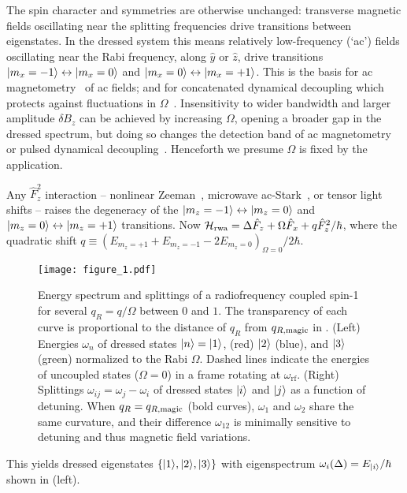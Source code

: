 \documentclass[aps,prl,reprint,superscriptaddress,floatfix]{revtex4-1}
\begin{document}
The spin character and symmetries are otherwise unchanged: transverse magnetic fields oscillating near the splitting frequencies drive transitions between eigenstates.
In the dressed system this means relatively low-frequency (`ac') fields oscillating near the Rabi frequency, along $\hat{y}$ or $\hat{z}$, drive transitions $\vert m_x=-1 \rangle  \leftrightarrow \vert m_x=0 \rangle $ and $\vert m_x=0 \rangle  \leftrightarrow \vert m_x=+1 \rangle $.
This is the basis for ac magnetometry~\cite{hirose_continuous_2012} of ac fields; and for concatenated dynamical decoupling  which protects against fluctuations in $\Omega$~\cite{cai_robust_2012}.
Insensitivity to wider bandwidth and larger amplitude $\delta B_z$ can be achieved by increasing $\Omega$, opening a broader gap in the dressed spectrum, but doing so changes the detection band of ac magnetometry~\cite{loretz_radio-frequency_2013} or pulsed dynamical decoupling~\cite{boss_quantum_2017,*schmitt_submillihertz_2017}.
Henceforth we presume $\Omega$ is fixed by the application.

Any $\hat{F}_z^2$ interaction -- nonlinear Zeeman~\cite{ramsey_molecular_1956}, microwave ac-Stark~\cite{gerbier_resonant_2006}, or tensor light~\cite{smith_continuous_2004} shifts -- raises the degeneracy of the $\vert m_z=-1 \rangle  \leftrightarrow \vert m_z=0 \rangle $ and $\vert m_z=0 \rangle  \leftrightarrow \vert m_z=+1 \rangle $ transitions. 
Now $\mathcal{H}_{\text{rwa}} = \Delta \hat{F}_z + \Omega \hat{F}_x + q \hat{F}_z^2/\hbar$, where the quadratic shift $q \equiv (E_{m_z=+1} + E_{m_z=-1} - 2 E_{m_z=0})_{\Omega=0}/2\hbar$.
\begin{figure}
    \texttt{[image: figure\_1.pdf]}
    \caption{
    \label{fig:eigensystem_schematic}
        Energy spectrum and splittings of a radiofrequency coupled spin-1 for several $q_R = q/\Omega$ between $0$ and $1$.
        The transparency of each curve is proportional to the distance of $q_R$ from $q_{R,\text{magic}}$ in .
        (Left) Energies $\omega_n$ of dressed states $\vert n \rangle =\vert 1 \rangle $, (red) $\vert 2 \rangle $ (blue), and $\vert 3 \rangle $ (green) normalized to the Rabi $\Omega$.
        Dashed lines indicate the energies of uncoupled states ($\Omega=0$) in a frame rotating at $\omega_{\text{rf}}$.
        (Right) Splittings $\omega_{ij} = \omega_j - \omega_i$ of dressed states $\vert i \rangle $ and $\vert j \rangle $ as a function of detuning.
        When $q_R=q_{R,\text{magic}}$ (bold curves), $\omega_1$ and $\omega_2$ share the same curvature, and their difference $\omega_{12}$ is minimally sensitive to detuning and thus magnetic field variations.
    }
\end{figure}
This yields dressed eigenstates $\{\vert 1 \rangle , \vert 2 \rangle , \vert 3 \rangle \}$ with eigenspectrum $\omega_i(\Delta) = E_{\vert i \rangle }/\hbar$ shown in  (left).
\end{document}
